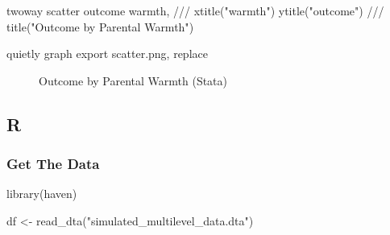 \documentclass[
  letterpaper,
  DIV=11,
  numbers=noendperiod]{scrreprt}
\newenvironment{Shaded}{\begin{snugshade}}{\end{snugshade}}
\newcommand{\BaseNTok}[1]{\textcolor[rgb]{0.68,0.00,0.00}{#1}}
\newcommand{\CommentTok}[1]{\textcolor[rgb]{0.37,0.37,0.37}{#1}}
\newcommand{\FunctionTok}[1]{\textcolor[rgb]{0.28,0.35,0.67}{#1}}
\newcommand{\KeywordTok}[1]{\textcolor[rgb]{0.00,0.23,0.31}{#1}}
\newcommand{\NormalTok}[1]{\textcolor[rgb]{0.00,0.23,0.31}{#1}}
\newcommand{\OtherTok}[1]{\textcolor[rgb]{0.00,0.23,0.31}{#1}}
\newcommand{\StringTok}[1]{\textcolor[rgb]{0.13,0.47,0.30}{#1}}
\begin{document}
\begin{Shaded}
\begin{Highlighting}[]
\KeywordTok{twoway} \KeywordTok{scatter}\NormalTok{ outcome warmth, }\CommentTok{///}
  \BaseNTok{xtitle}\NormalTok{(}\StringTok{"warmth"}\NormalTok{) }\BaseNTok{ytitle}\NormalTok{(}\StringTok{"outcome"}\NormalTok{) }\CommentTok{///}
  \BaseNTok{title}\NormalTok{(}\StringTok{"Outcome by Parental Warmth"}\NormalTok{) }

\KeywordTok{quietly} \KeywordTok{graph} \KeywordTok{export} \KeywordTok{scatter}\NormalTok{.png, }\KeywordTok{replace}
\end{Highlighting}
\end{Shaded}

\begin{figure}


\caption{\label{fig-Stata}Outcome by Parental Warmth (Stata)}

\end{figure}%

\subsection{R}

\subsubsection{Get The Data}\label{get-the-data-1}

\begin{Shaded}
\begin{Highlighting}[]
\FunctionTok{library}\NormalTok{(haven)}

\NormalTok{df }\OtherTok{\textless{}{-}} \FunctionTok{read\_dta}\NormalTok{(}\StringTok{"simulated\_multilevel\_data.dta"}\NormalTok{)}
\end{Highlighting}
\end{Shaded}
\end{document}
